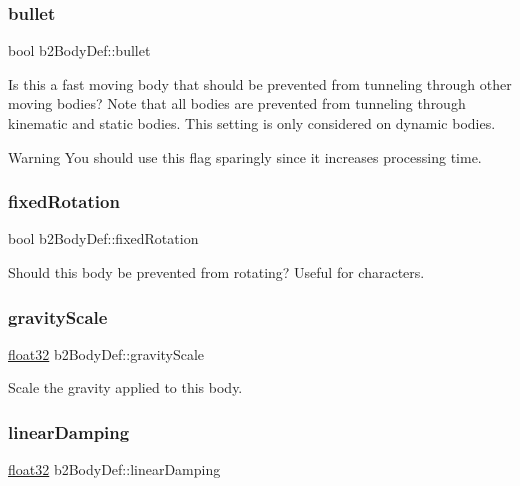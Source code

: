 \subsubsection{\texorpdfstring{bullet}{bullet}}
{\footnotesize\ttfamily bool b2\+Body\+Def\+::bullet}

Is this a fast moving body that should be prevented from tunneling through other moving bodies? Note that all bodies are prevented from tunneling through kinematic and static bodies. This setting is only considered on dynamic bodies. \begin{DoxyWarning}{Warning}
You should use this flag sparingly since it increases processing time. 
\end{DoxyWarning}
\mbox{\label{structb2_body_def_a273a51c57440a8884de5939d76b6e3ea}} 
\subsubsection{\texorpdfstring{fixedRotation}{fixedRotation}}
{\footnotesize\ttfamily bool b2\+Body\+Def\+::fixed\+Rotation}



Should this body be prevented from rotating? Useful for characters. 

\mbox{\label{structb2_body_def_aadea3fa173ed1014739ec8b023de4336}} 
\subsubsection{\texorpdfstring{gravityScale}{gravityScale}}
{\footnotesize\ttfamily \mbox{\hyperlink{b2_settings_8h_aacdc525d6f7bddb3ae95d5c311bd06a1}{float32}} b2\+Body\+Def\+::gravity\+Scale}



Scale the gravity applied to this body. 

\mbox{\label{structb2_body_def_a728f6df3be7dedb331455105e3659d46}} 
\subsubsection{\texorpdfstring{linearDamping}{linearDamping}}
{\footnotesize\ttfamily \mbox{\hyperlink{b2_settings_8h_aacdc525d6f7bddb3ae95d5c311bd06a1}{float32}} b2\+Body\+Def\+::linear\+Damping}

